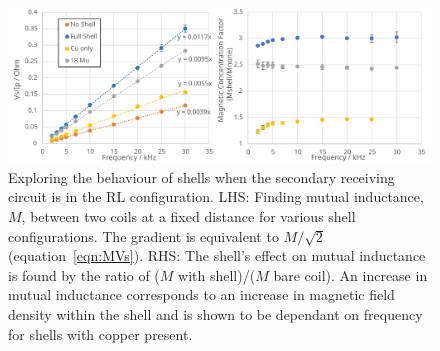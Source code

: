\documentclass[11pt]{iopart}
\begin{document}
\begin{figure}
  \begin{center}
   \noindent\includegraphics[width=0.85\linewidth]{images/RL-graphs.pdf}
  \end{center}
  \caption{Exploring the behaviour of shells when the secondary
    receiving circuit is in the RL configuration. LHS: Finding mutual
    inductance, $M$, between two coils at a fixed distance for various
    shell configurations.  The gradient is equivalent to $M/\sqrt{2}$
    (equation~\ref{eqn:MVs}). RHS: The shell's effect on mutual
    inductance is found by the ratio of ($M$ with shell)/($M$ bare
    coil). An increase in mutual inductance corresponds to an increase
    in magnetic field density within the shell and is shown to be
    dependant on frequency for shells with copper
    present.}\label{fig:RL-F}
\end{figure}
\end{document}

